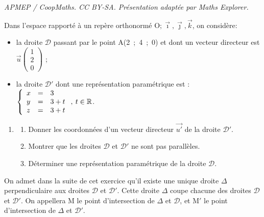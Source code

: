 \documentclass[10pt]{article}
\providecommand{\R}{\mathbb{R}}
\providecommand{\vect}[1]{\overrightarrow{#1}}
\providecommand{\Oijk}{\(\mathrm{O};\vec{\imath},\vec{\jmath},\vec{k}\)}
\begin{document}
\noindent\textit{APMEP / CoopMaths. CC BY-SA. Présentation adaptée par Maths Explorer.}\par\medskip
\medskip

Dans l'espace rapporté à un repère orthonormé \Oijk, on considère:

\begin{itemize}
\item[$\bullet~~$] la droite $\mathcal{D}$ passant par le point A(2~;~4~;~0) et dont un vecteur directeur est $\vect{u}\begin{pmatrix}1\\2\\0\end{pmatrix}$ ;
\item[$\bullet~~$] la droite $\mathcal{D}'$ dont une représentation paramétrique est : $\left\{\begin{array}{l c l}
x&=&3\\
y&=& 3 + t\\
z&=&3 + t
\end{array}\right. ,\: t \in \R$.
\end{itemize}

\medskip

\begin{enumerate}
\item 

	\begin{enumerate}
		\item Donner les coordonnées d'un vecteur directeur $\vect{u'}$ de la droite $\mathcal{D}'$.
		\item Montrer que les droites $\mathcal{D}$ et $\mathcal{D}'$ ne sont pas parallèles.
		\item Déterminer une représentation paramétrique de la droite $\mathcal{D}$.
	\end{enumerate}
\end{enumerate}

On admet dans la suite de cet exercice qu'il existe une unique droite $\Delta$ perpendiculaire aux droites $\mathcal{D}$ et $\mathcal{D}'$. Cette droite $\Delta$ coupe chacune des droites $\mathcal{D}$ et $\mathcal{D}'$. On appellera M le point d'intersection de $\Delta$ et $\mathcal{D}$, et M$'$ le point d'intersection de $\Delta$ et $\mathcal{D}'$.
\end{document}
